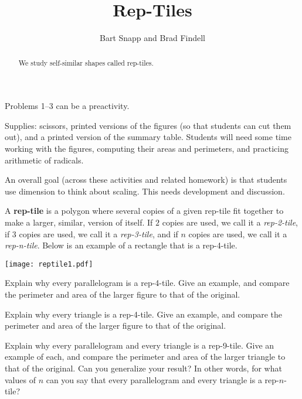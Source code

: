 \documentclass[nooutcomes]{ximera}
\title{Rep-Tiles}
\author{Bart Snapp and Brad Findell}
\begin{document}
\begin{abstract}
  We study self-similar shapes called rep-tiles.
\end{abstract}
\maketitle

\begin{teachingnote}
Problems 1--3 can be a preactivity.  

Supplies: scissors, printed versions of the figures (so that students can cut them out), and a printed version of the summary table.   Students will need some time working with the figures, computing their areas and perimeters, and practicing arithmetic of radicals.   

An overall goal (across these activities and related homework) is that students use dimension to think about scaling. This needs development and discussion.  
\end{teachingnote}

A \textbf{rep-tile} is a polygon where several copies of
a given rep-tile fit together to make a larger, similar, version of
itself. If $2$ copies are used, we call it a \textit{rep-2-tile}, if
$3$ copies are used, we call it a \textit{rep-3-tile}, and if $n$ copies
are used, we call it a \textit{rep-n-tile}.  Below is an example of a rectangle 
that is a rep-4-tile.
\begin{image}
\texttt{[image: reptile1.pdf]}
\end{image}
\begin{problem}
Explain why every parallelogram is a rep-4-tile. Give an example, and compare the perimeter and area of the larger figure to that of the original.
\vfill
\end{problem}

\begin{problem}
Explain why every triangle is a rep-4-tile. Give an example, and compare the perimeter and area of the larger figure to that of the
original.
\vfill
\end{problem}

\newpage

\begin{problem}
Explain why every parallelogram and every triangle is a rep-9-tile. Give an example of each, and compare the perimeter and area of the larger triangle to that of the original. Can you generalize your result?  In other words, for what values of $n$ can you say that every parallelogram and every triangle is a rep-$n$-tile?  
\vfill
\end{problem}
\end{document}

